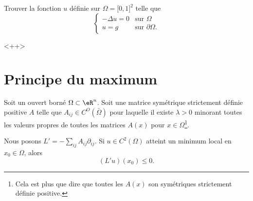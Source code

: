 \begin{example}
    Trouver la fonction \( u\) définie sur \( \Omega= \mathopen[ 0 , 1 \mathclose]^2\) telle que
    \begin{equation}
        \begin{cases}
            -\Delta u=0    &   \text{sur } \Omega\\
            u=g    &    \text{sur }\partial \Omega.
        \end{cases}
    \end{equation}

\end{example}
<++>

\section{Principe du maximum}

\begin{lemma}        \label{LEMooSPVUooDQOeom}
    Soit un ouvert borné \( \Omega\subset \eR^n\). Soit une matrice symétrique strictement définie positive \( A\) telle que \( A_{ij}\in C^O(\bar \Omega)\) pour laquelle il existe \( \lambda>0\) minorant toutes les valeurs propres de toutes les matrices \( A(x)\) pour \( x\in \Omega\)\footnote{Cela est plus que dire que toutes les \( A(x)\) son symétriques strictement définie positive.}.

    Nous posons \( L'=-\sum_{ij}A_{ij}\partial_{ij}\). Si \( u\in C^2(\Omega)\) atteint un minimum local en \( x_0\in \Omega\), alors
    \begin{equation}
        (L'u)(x_0)\leq 0.
    \end{equation}
\end{lemma}

